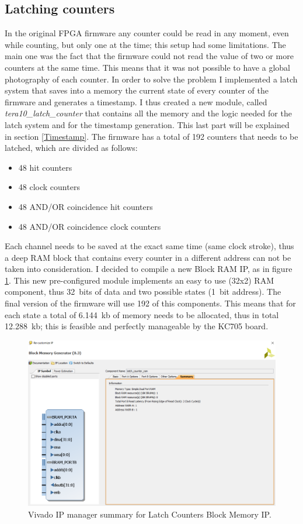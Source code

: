 \subsection{Latching counters}\label{Latch}
\noindent In the original FPGA firmware any counter could be read in any moment, even while counting, but only one at the time; this setup had some limitations.
The main one was the fact that the firmware could not read the value of two or more counters at the same time.
This means that it was not possible to have a global photography of each counter.
In order to solve the problem I implemented a latch system that saves into a memory the current state of every counter of the firmware and generates a timestamp.
I thus created a new module, called \textit{tera10\_latch\_counter} that contains all the memory and the logic needed for the latch system and for the timestamp generation. This last part will be explained in section \ref{Timestamp}.
The firmware has a total of 192 counters that needs to be latched, which are divided as follows:
\begin{itemize}
	\item 48 hit counters
	\item 48 clock counters
	\item 48 AND/OR coincidence hit counters
	\item 48 AND/OR coincidence clock counters
\end{itemize}
\noindent Each channel needs to be saved at the exact same time (same clock stroke), thus a deep RAM block that contains every counter in a different address can not be taken into consideration.
I decided to compile a new Block RAM IP, as in figure \ref{fig:ramip}. This new pre-configured module implements an easy to use (32x2) RAM component, thus 32~bits of data and two possible states (1~bit address). The final version of the firmware will use 192 of this components.
This means that for each state a total of 6.144~kb of memory needs to be allocated, thus in total 12.288~kb; this is feasible and perfectly manageable by the KC705 board. 
\begin{figure}[H]
	\centering
	\includegraphics[width=0.5\linewidth]{IMG/ch4/LATCH_RAM_IP}
	\caption{Vivado IP manager summary for Latch Counters Block Memory IP.}
	\label{fig:ramip}
\end{figure}
